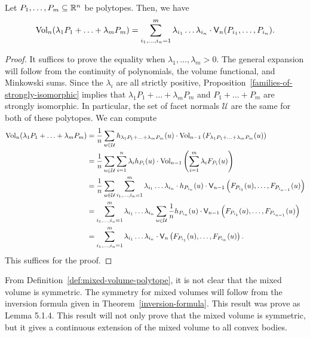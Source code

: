 \documentclass{puthesis-UG}
\begin{document}
\begin{thm} \label{mixed-volume-polynomial-expansion}
	Let $P_1, \ldots, P_m \subseteq \mathbb{R}^n$ be polytopes. Then, we have 
	\[
		\operatorname{Vol}_n(\lambda_1 P_1 + \ldots + \lambda_m P_m) = \sum_{i_1, \ldots, i_n = 1}^m \lambda_{i_1} \ldots \lambda_{i_n} \cdot \mathsf{V}_n (P_{i_1}, \ldots, P_{i_n}).
	\]
\end{thm}

\begin{proof}
	It suffices to prove the equality when $\lambda_1, \ldots, \lambda_m > 0$. The general expansion will follow from the continuity of polynomials, the volume functional, and Minkowski sums. Since the $\lambda_i$ are all strictly positive, Proposition~\ref{families-of-strongly-isomorphic} implies that $\lambda_1 P_1 + \ldots + \lambda_m P_m$ and $P_1 + \ldots + P_m$ are strongly isomorphic. In particular, the set of facet normals $\mathcal{U}$ are the same for both of these polytopes. We can compute 
	\begin{align*}
		\operatorname{Vol}_n (\lambda_1 P_1 + \ldots + \lambda_m P_m) & = \frac{1}{n} \sum_{u \in \mathcal{U}} h_{\lambda_1 P_1 + \ldots + \lambda_m P_m}(u) \cdot \operatorname{Vol}_{n-1} \left ( F_{\lambda_1 P_1 + \ldots + \lambda_m P_m} (u) \right ) \\
		& = \frac{1}{n} \sum_{u \in \mathcal{U}} \sum_{i = 1}^n \lambda_i h_{P_i}(u) \cdot \operatorname{Vol}_{n-1} \left ( \sum_{i = 1}^m \lambda_i F_{P_i}(u) \right ) \\
		& = \frac{1}{n} \sum_{u \in \mathcal{U}} \sum_{i_1, \ldots, i_n = 1}^m \lambda_{i_1} \ldots \lambda_{i_n} \cdot h_{P_{i_n}}(u) \cdot \mathsf{V}_{n-1} \left (F_{P_{i_1}}(u), \ldots, F_{P_{i_{n-1}}}(u) \right ) \\
		& = \sum_{i_1, \ldots, i_n = 1}^m \lambda_{i_1} \ldots \lambda_{i_n} \sum_{u \in \mathcal{U}} \frac{1}{n} h_{P_{i_n}}(u) \cdot \mathsf{V}_{n-1} \left (F_{P_{i_1}}(u), \ldots, F_{P_{i_{n-1}}}(u) \right ) \\
		& = \sum_{i_1, \ldots, i_n = 1}^m \lambda_{i_1} \ldots \lambda_{i_n} \cdot \mathsf{V}_n \left (F_{P_{i_1}}(u), \ldots, F_{P_{i_{n}}}(u) \right ). 
	\end{align*}
	This suffices for the proof. 
\end{proof}

From Definition~\ref{def:mixed-volume-polytope}, it is not clear that the mixed volume is symmetric. The symmetry for mixed volumes will follow from the inversion formula given in Theorem~\ref{inversion-formula}. This result was prove \cite{schneider_2013} as Lemma 5.1.4. This result will not only prove that the mixed volume is symmetric, but it gives a continuous extension of the mixed volume to all convex bodies.
\end{document}

